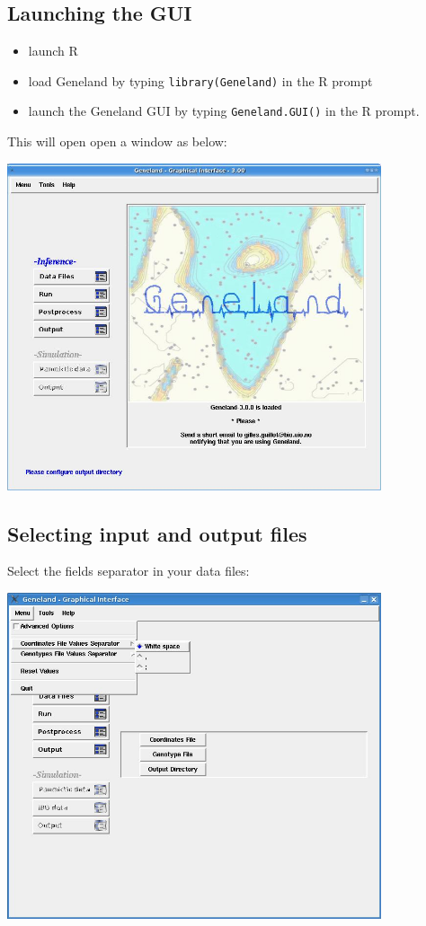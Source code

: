 \documentclass[a4paper,10pt]{article}
\begin{document}
\subsection{Launching the GUI}

\begin{itemize}
\item launch R
\item load {\sc Geneland} by typing \texttt{library(Geneland)} in the R prompt
\item launch the {\sc Geneland} GUI by typing \texttt{Geneland.GUI()} in the R prompt.
\end{itemize}

This will open open a window as below:\\

\centerline{\includegraphics[width=11cm]{./fig/initial.jpg}}

\clearpage
\subsection{Selecting input and output files}


Select the fields separator in your data files:\\

\centerline{\includegraphics[width=11cm]{./fig/choosesep.jpg}}
\end{document}
